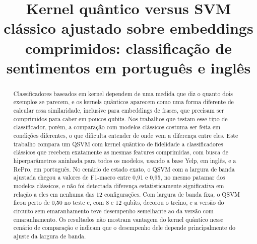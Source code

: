 \documentclass[conference]{IEEEtran}
\begin{document}
\title{Kernel quântico versus SVM clássico ajustado sobre embeddings comprimidos: classificação de sentimentos em português e inglês}

\author{
\and
{}
}

\maketitle

\renewcommand{\abstractname}{Resumo}
\renewcommand{\IEEEkeywordsname}{Palavras-chave}
\begin{abstract}
Classificadores baseados em kernel dependem de uma medida que diz o quanto dois exemplos se parecem, e os kernels quânticos aparecem como uma forma diferente de calcular essa similaridade, inclusive para embeddings de frases, que precisam ser comprimidos para caber em poucos qubits. Nos trabalhos que testam esse tipo de classificador, porém, a comparação com modelos clássicos costuma ser feita em condições diferentes, o que dificulta entender de onde vem a diferença entre eles. Este trabalho compara um QSVM com kernel quântico de fidelidade a classificadores clássicos que recebem exatamente as mesmas features comprimidas, com busca de hiperparâmetros aninhada para todos os modelos, usando a base Yelp, em inglês, e a RePro, em português. No cenário de estado exato, o QSVM com a largura de banda ajustada chegou a valores de F1-macro entre 0,91 e 0,95, no mesmo patamar dos modelos clássicos, e não foi detectada diferença estatisticamente significativa em relação a eles em nenhuma das 12 configurações. Com largura de banda fixa, o QSVM ficou perto de 0,50 no teste e, com 8 e 12 qubits, decorou o treino, e a versão do circuito sem emaranhamento teve desempenho semelhante ao da versão com emaranhamento. Os resultados não mostram vantagem do kernel quântico nesse cenário de comparação e indicam que o desempenho dele depende principalmente do ajuste da largura de banda.
\end{abstract}
\end{document}

